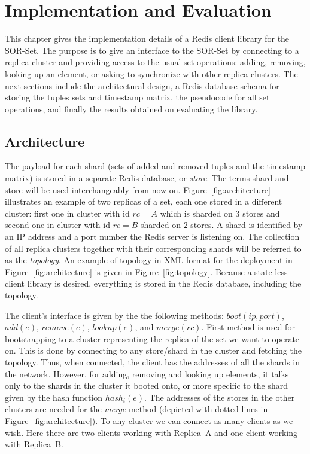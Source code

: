 \chapter{Implementation and Evaluation}
\label{ch:implementation_and_evaluation}

This chapter gives the implementation details of a Redis client library for the
SOR-Set. The purpose is to give an interface to the SOR-Set by connecting to a
replica cluster and providing access to the usual set operations: adding,
removing, looking up an element, or asking to synchronize with other replica
clusters. The next sections include the architectural design, a Redis database
schema for storing the tuples sets and timestamp matrix, the pseudocode for all
set operations, and finally the results obtained on evaluating the library.

\section{Architecture}
\label{sec:architecture}

The payload for each shard (sets of added and removed tuples and the timestamp
matrix) is stored in a separate Redis database, or \textit{store}. The terms
shard and store will be used interchangeably from now on.
Figure~\ref{fig:architecture} illustrates an example of two replicas of a set,
each one stored in a different cluster: first one in cluster with id $rc = A$
which is sharded on 3 stores and second one in cluster with id $rc = B$ sharded
on 2 stores. A shard is identified by an IP address and a port number the Redis
server is listening on. The collection of all replica clusters together with
their corresponding shards will be referred to as the \textit{topology}. An
example of topology in XML format for the deployment in
Figure~\ref{fig:architecture} is given in Figure~\ref{fig:topology}. Because
a state-less client library is desired, everything is stored in the Redis
database, including the topology.

The client's interface is given by the the following methods: $\textit{boot}(ip,
port)$, $\textit{add}(e)$, $\textit{remove}(e)$, $\textit{lookup}(e)$, and
$\textit{merge}(rc)$. First method is used for bootstrapping to a cluster
representing the replica of the set we want to operate on. This is done by
connecting to any store/shard in the cluster and fetching the topology. Thus,
when connected, the client has the addresses of all the shards in the network.
However, for adding, removing and looking up elements, it talks only to the
shards in the cluster it booted onto, or more specific to the shard given by the
hash function $hash_{i}(e)$. The addresses of the stores in the other clusters
are needed for the \textit{merge} method (depicted with dotted lines in
Figure~\ref{fig:architecture}). To any cluster we can connect as many clients as
we wish. Here there are two clients working with Replica~A and one client
working with Replica~B.

